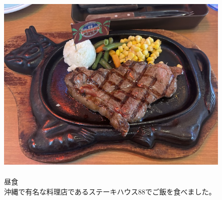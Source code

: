 \documentclass[../main]{subfiles}
\begin{document}
\begin{figure}[H]
  \begin{minipage}[b]{0.48\columnwidth}
    \caption{\\
    昼食\\
    沖縄で有名な料理店であるステーキハウス88でご飯を食べました。
    }
  \end{minipage}
  \hspace{0.04\columnwidth} %
  \begin{minipage}[b]{0.48\columnwidth}
    \centering
    \includegraphics[width=\columnwidth]{figure/steak88.jpeg}
  \end{minipage}
\end{figure}
\end{document}

